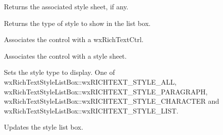 
Returns the associated style sheet, if any.

\label{wxrichtextstylelistctrlgetstyletype}


Returns the type of style to show in the list box.

\label{wxrichtextstylelistctrlsetrichtextctrl}


Associates the control with a wxRichTextCtrl.

\label{wxrichtextstylelistctrlsetstylesheet}


Associates the control with a style sheet.

\label{wxrichtextstylelistctrlsetstyletype}


Sets the style type to display. One of wxRichTextStyleListBox::wxRICHTEXT\_STYLE\_ALL, wxRichTextStyleListBox::wxRICHTEXT\_STYLE\_PARAGRAPH,
wxRichTextStyleListBox::wxRICHTEXT\_STYLE\_CHARACTER and wxRichTextStyleListBox::wxRICHTEXT\_STYLE\_LIST.

\label{wxrichtextstylelistctrlupdatestyles}


Updates the style list box. 

